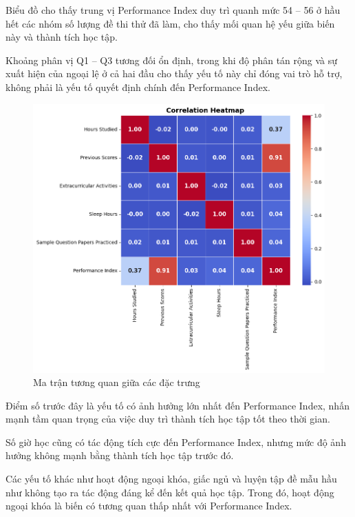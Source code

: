 Biểu đồ cho thấy trung vị Performance Index duy trì quanh mức 54 – 56 ở hầu hết các nhóm số lượng đề thi thử đã làm, cho thấy mối quan hệ yếu giữa biến này và thành tích học tập.

Khoảng phân vị Q1 – Q3 tương đối ổn định, trong khi độ phân tán rộng và sự xuất hiện của ngoại lệ ở cả hai đầu cho thấy yếu tố này chỉ đóng vai trò hỗ trợ, không phải là yếu tố quyết định chính đến Performance Index.

\begin{figure}[H]

	\centering
	\includegraphics[width=\textwidth]{images/eda/8.png}
	\caption{Ma trận tương quan giữa các đặc trưng}
\end{figure}

Điểm số trước đây là yếu tố có ảnh hưởng lớn nhất đến Performance Index, nhấn mạnh tầm quan trọng của việc duy trì thành tích học tập tốt theo thời gian.

Số giờ học cũng có tác động tích cực đến Performance Index, nhưng mức độ ảnh hưởng không mạnh bằng thành tích học tập trước đó.

Các yếu tố khác như hoạt động ngoại khóa, giấc ngủ và luyện tập đề mẫu hầu như không tạo ra tác động đáng kể đến kết quả học tập. Trong đó, hoạt động ngoại khóa là biến có tương quan thấp nhất với Performance Index.

